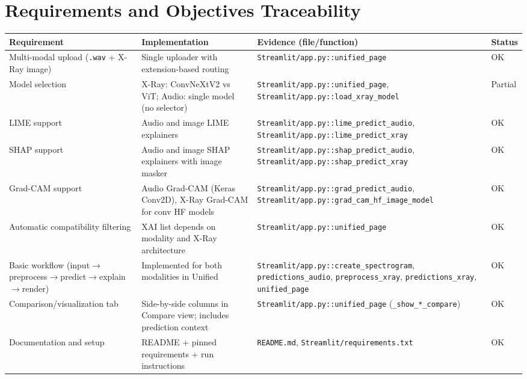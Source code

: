\documentclass[11pt,a4paper]{article}
\begin{document}
\section{Requirements and Objectives Traceability}
\begin{longtable}{@{}p{}p{}p{}p{}@{}}
\toprule
\textbf{Requirement} & \textbf{Implementation} & \textbf{Evidence (file/function)} & \textbf{Status} \\
\midrule
\endhead
Multi-modal upload (\texttt{.wav} + X-Ray image) & Single uploader with extension-based routing & \texttt{Streamlit/app.py::unified\_page} & OK \\
Model selection & X-Ray: ConvNeXtV2 vs ViT; Audio: single model (no selector) & \texttt{Streamlit/app.py::unified\_page}, \texttt{Streamlit/app.py::load\_xray\_model} & Partial \\
LIME support & Audio and image LIME explainers & \texttt{Streamlit/app.py::lime\_predict\_audio}, \texttt{Streamlit/app.py::lime\_predict\_xray} & OK \\
SHAP support & Audio and image SHAP explainers with image masker & \texttt{Streamlit/app.py::shap\_predict\_audio}, \texttt{Streamlit/app.py::shap\_predict\_xray} & OK \\
Grad-CAM support & Audio Grad-CAM (Keras Conv2D), X-Ray Grad-CAM for conv HF models & \texttt{Streamlit/app.py::grad\_predict\_audio}, \texttt{Streamlit/app.py::grad\_cam\_hf\_image\_model} & OK \\
Automatic compatibility filtering & XAI list depends on modality and X-Ray architecture & \texttt{Streamlit/app.py::unified\_page} & OK \\
Basic workflow (input$\rightarrow$preprocess$\rightarrow$predict$\rightarrow$explain$\rightarrow$render) & Implemented for both modalities in Unified & \texttt{Streamlit/app.py::create\_spectrogram}, \texttt{predictions\_audio}, \texttt{preprocess\_xray}, \texttt{predictions\_xray}, \texttt{unified\_page} & OK \\
Comparison/visualization tab & Side-by-side columns in Compare view; includes prediction context & \texttt{Streamlit/app.py::unified\_page} (\texttt{\_show\_*\_compare}) & OK \\
Documentation and setup & README + pinned requirements + run instructions & \texttt{README.md}, \texttt{Streamlit/requirements.txt} & OK \\
\bottomrule
\end{longtable}
\end{document}
